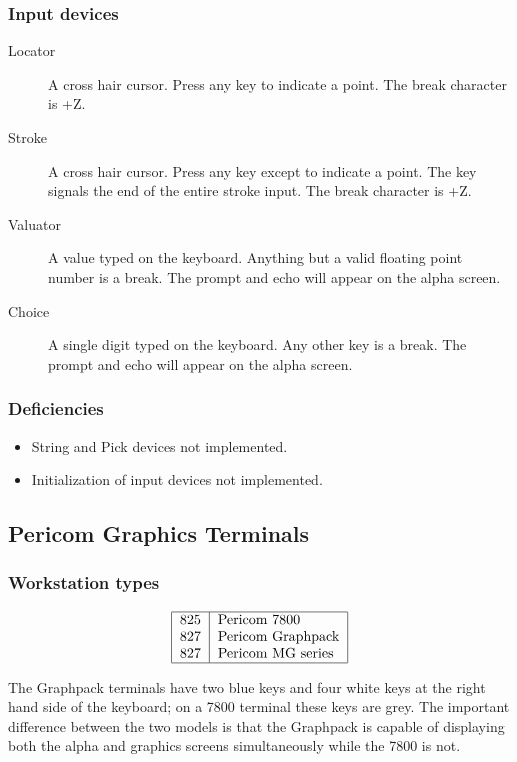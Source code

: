 \subsubsection{Input devices}
\begin{description}
\item[Locator] A cross hair cursor.         
Press any key to indicate a point.
The break character is +Z.
\item[Stroke] A cross hair cursor.
Press any key except  to indicate a point.
The  key signals the end of the entire stroke input.
The break character is +Z.
\item[Valuator] A value typed on the keyboard.
Anything but a valid floating point number is a break.
The prompt and echo will appear on the alpha screen.
\item[Choice] A single digit typed on the keyboard.
Any other key is a break.
The prompt and echo will appear on the alpha screen.
\end{description}
\subsubsection{Deficiencies}
\begin{itemize}
\item String and Pick devices not implemented.
\item Initialization of input devices not implemented.
\end{itemize}

\subsection{Pericom Graphics Terminals}
\label{pergt}
\subsubsection{Workstation types}
\[\begin{tabular}{|l|l|}\hline
825 &Pericom 7800\\
827 &Pericom Graphpack\\
827 &Pericom MG series\\\hline
\end{tabular}\]

The Graphpack terminals have two blue keys and four white keys at the right hand
side of the keyboard; on a 7800 terminal these keys are grey.
The important difference between the two models is that the Graphpack is capable
of displaying both the alpha and graphics screens simultaneously while the 7800
is not.

